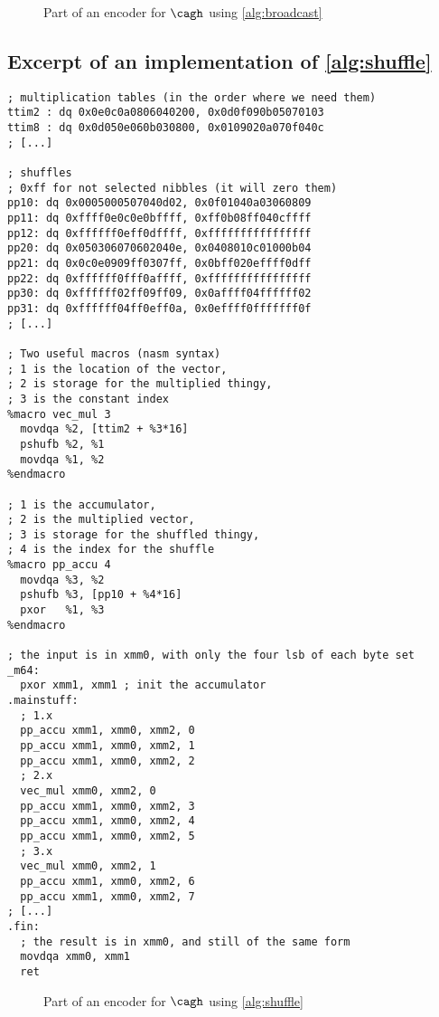 \begin{figure}[!htb]
\caption{Part of an encoder for $\cagh$ using \autoref{alg:broadcast}}
\end{figure}


\FloatBarrier

\subsection{Excerpt of an implementation of \autoref{alg:shuffle}}
\label{app:spec}
\begin{verbatim}
; multiplication tables (in the order where we need them)
ttim2 : dq 0x0e0c0a0806040200, 0x0d0f090b05070103
ttim8 : dq 0x0d050e060b030800, 0x0109020a070f040c
; [...]

; shuffles
; 0xff for not selected nibbles (it will zero them)
pp10: dq 0x0005000507040d02, 0x0f01040a03060809
pp11: dq 0xffff0e0c0e0bffff, 0xff0b08ff040cffff
pp12: dq 0xffffff0eff0dffff, 0xffffffffffffffff
pp20: dq 0x050306070602040e, 0x0408010c01000b04
pp21: dq 0x0c0e0909ff0307ff, 0x0bff020effff0dff
pp22: dq 0xffffff0fff0affff, 0xffffffffffffffff
pp30: dq 0xffffff02ff09ff09, 0x0affff04ffffff02
pp31: dq 0xffffff04ff0eff0a, 0x0effff0fffffff0f
; [...]

; Two useful macros (nasm syntax)
; 1 is the location of the vector,
; 2 is storage for the multiplied thingy,
; 3 is the constant index
%macro vec_mul 3
  movdqa %2, [ttim2 + %3*16]
  pshufb %2, %1
  movdqa %1, %2
%endmacro

; 1 is the accumulator,
; 2 is the multiplied vector,
; 3 is storage for the shuffled thingy,
; 4 is the index for the shuffle
%macro pp_accu 4
  movdqa %3, %2
  pshufb %3, [pp10 + %4*16]
  pxor   %1, %3
%endmacro

; the input is in xmm0, with only the four lsb of each byte set
_m64:
  pxor xmm1, xmm1 ; init the accumulator
.mainstuff:
  ; 1.x
  pp_accu xmm1, xmm0, xmm2, 0
  pp_accu xmm1, xmm0, xmm2, 1
  pp_accu xmm1, xmm0, xmm2, 2
  ; 2.x
  vec_mul xmm0, xmm2, 0
  pp_accu xmm1, xmm0, xmm2, 3
  pp_accu xmm1, xmm0, xmm2, 4
  pp_accu xmm1, xmm0, xmm2, 5
  ; 3.x
  vec_mul xmm0, xmm2, 1
  pp_accu xmm1, xmm0, xmm2, 6
  pp_accu xmm1, xmm0, xmm2, 7
; [...]
.fin:
  ; the result is in xmm0, and still of the same form
  movdqa xmm0, xmm1
  ret
\end{verbatim}
\begin{figure}[!htb]
\caption{Part of an encoder for $\cagh$ using \autoref{alg:shuffle}}
\end{figure}

\renewcommand\thesection{\arabic{section}}
